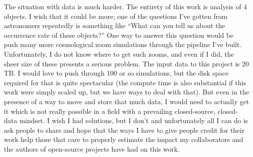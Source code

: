 The situation with data is much harder.
The entirety of this work is analysis of 4 objects.
I wish that it could be more; one of the questions I've gotten from astronomers repeatedly is something like ``What can you tell us about the occurrence rate of these objects?''
One way to answer this question would be push many more cosmological zoom simulations through the pipeline I've built.
Unfortunately, I do not know where to get such zooms, and even if I did, the sheer size of these presents a serious problem.
The input data to this project is 20 TB.
I would love to push through 100 or so simulations, but the disk space required for that is quite spectacular (the compute time is also substantial if this work were simply scaled up, but we have ways to deal with that).
But even in the presence of a way to move and store that much data, I would need to actually get it which is not really possible in a field with a prevailing closed-source, closed-data mindset.
I wish I had solutions, but I don't and unfortunately all I can do is ask people to share and hope that the ways I have to give people credit for their work help those that care to properly estimate the impact my collaborators and the authors of open-source projects have had on this work.
